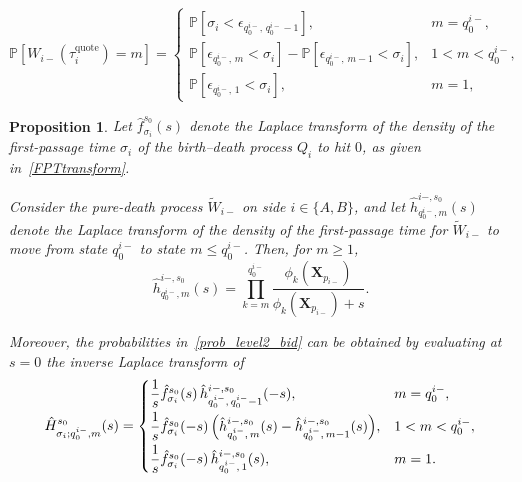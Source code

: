 \documentclass[10pt,a4paper]{amsart}
\newtheorem{proposition}{Proposition}
\begin{document}
\begin{equation}\label{prob_level2_bid}
\mathbb{P}[W_{i-}(\tau_i^{\text{quote}})=m]=
\begin{cases}
\mathbb{P}[\sigma_i<\epsilon_{q_0^{i-},\,q_0^{i-}-1}], & m=q_0^{i-}, \\[0.4em]
\mathbb{P}[\epsilon_{q_0^{i-},\,m}<\sigma_i]-\mathbb{P}[\epsilon_{q_0^{i-},\,m-1}<\sigma_i], & 1<m<q_0^{i-}, \\[0.4em]
\mathbb{P}[\epsilon_{q_0^{i-},\,1}<\sigma_i], & m=1,
\end{cases}
\end{equation}

\begin{proposition}\label{prop_3_level2}
Let $\hat{f}_{\sigma_i}^{s_0}(s)$ denote the Laplace transform of the density of the first-passage time $\sigma_i$ of the birth--death process $Q_i$ to hit $0$, as given in~\eqref{FPTtransform}. 

Consider the pure-death process $\tilde{W}_{i-}$ on side $i\in\{A,B\}$, and let $\hat{h}_{q_0^{i-},m}^{i-,s_0}(s)$ denote the Laplace transform of the density of the first-passage time for $\tilde{W}_{i-}$ to move from state $q_0^{i-}$ to state $m\leq q_0^{i-}$. Then, for $m\geq 1$,
\begin{equation}
\hat{h}_{q_0^{i-},m}^{i-,s_0}(s)
=
\prod_{k=m}^{q_0^{i-}}
\frac{\phi_k(\boldsymbol{X}_{p_{i-}})}
{\phi_k(\boldsymbol{X}_{p_{i-}})+s}.
\end{equation}

Moreover, the probabilities in~\eqref{prob_level2_bid} can be obtained by evaluating at $s=0$ the inverse Laplace transform of
\begin{equation}
\hat{H}^{s_0}_{\sigma_i; q_0^{i-}, m}(s)=
\begin{cases}
\dfrac{1}{s}\hat{f}^{s_0}_{\sigma_i}(s)\,
\hat{h}^{i-, s_0}_{q_0^{i-},\,q_0^{i-}-1}(-s),
& m=q_0^{i-}, \\[0.6em]
\dfrac{1}{s}\hat{f}^{s_0}_{\sigma_i}(-s)\,
\Bigl(\hat{h}^{i-, s_0}_{q_0^{i-},\,m}(s)
-\hat{h}^{i-, s_0}_{q_0^{i-},\,m-1}(s)\Bigr),
& 1<m<q_0^{i-}, \\[0.6em]
\dfrac{1}{s}\hat{f}^{s_0}_{\sigma_i}(-s)\,
\hat{h}^{i-, s_0}_{q_0^{i-},\,1}(s),
& m=1.
\end{cases}
\end{equation}
\end{proposition}
\end{document}
